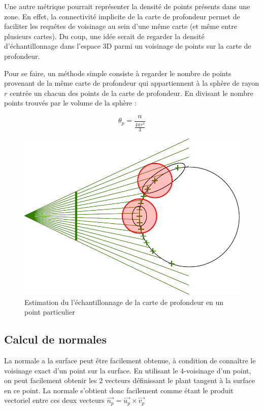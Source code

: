 \documentclass{report}
\begin{document}
Une autre métrique pourrait représenter la densité de points présents dans une zone.
En effet, la connectivité implicite de la carte de profondeur permet de faciliter les requêtes de voisinage au sein d'une même carte (et même entre plusieurs cartes).
Du coup, une idée serait de regarder la densité d'échantillonnage dans l'espace 3D parmi un voisinage de points sur la carte de profondeur.

Pour se faire, un méthode simple consiste à regarder le nombre de points provenant de la même carte de profondeur qui appartiennent à la sphère de rayon $r$ centrée un chacun des points de la carte de profondeur. En divisant le nombre points trouvés par le volume de la sphère :

\begin{equation}
	\theta_p = \frac{n}{\frac{4\pi r^3}{3}}
\end{equation}

\begin{figure}[h]
\centering
	\includegraphics[scale=0.5]{GoodVisibility-Density}
	\caption{Estimation du l'échantillonnage de la carte de profondeur en un point particulier}
\end{figure}

\subsection{Calcul de normales}

La normale a la surface peut être facilement obtenue, à condition de connaître le voisinage exact d'un point sur la surface.
En utilisant le 4-voisinage d'un point, on peut facilement obtenir les 2 vecteurs définissant le plant tangent à la surface en ce point.
La normale s'obtient donc facilement comme étant le produit vectoriel entre ces deux vecteurs $\vec{n_p} = \vec{u_p} \times \vec{v_p}$
\end{document}
